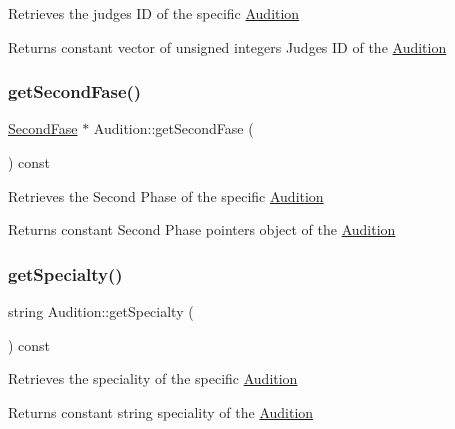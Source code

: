 Retrieves the judges\textquotesingle{} ID of the specific \hyperlink{class_audition}{Audition} \begin{DoxyReturn}{Returns}
constant vector of unsigned integers Judges\textquotesingle{} ID of the \hyperlink{class_audition}{Audition} 
\end{DoxyReturn}
\mbox{\label{class_audition_a232b0afa9a4901ecab54a97424b328e1}} 
\subsubsection{\texorpdfstring{get\+Second\+Fase()}{getSecondFase()}}
{\footnotesize\ttfamily \hyperlink{class_second_fase}{Second\+Fase} $\ast$ Audition\+::get\+Second\+Fase (\begin{DoxyParamCaption}{ }\end{DoxyParamCaption}) const}

Retrieves the Second Phase of the specific \hyperlink{class_audition}{Audition} \begin{DoxyReturn}{Returns}
constant Second Phase pointer\textquotesingle{}s object of the \hyperlink{class_audition}{Audition} 
\end{DoxyReturn}
\mbox{\label{class_audition_aaa7cac841f79eec747981194046818f5}} 
\subsubsection{\texorpdfstring{get\+Specialty()}{getSpecialty()}}
{\footnotesize\ttfamily string Audition\+::get\+Specialty (\begin{DoxyParamCaption}{ }\end{DoxyParamCaption}) const}

Retrieves the speciality of the specific \hyperlink{class_audition}{Audition} \begin{DoxyReturn}{Returns}
constant string speciality of the \hyperlink{class_audition}{Audition} 
\end{DoxyReturn}
\mbox{\label{class_audition_ac4fc745ecaa9e6975dab7ed779d732d0}} 
